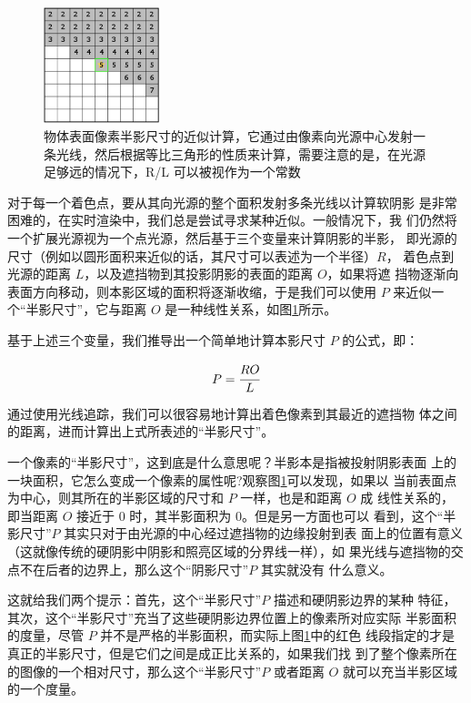 \begin{figure}
\sidecaption
	\includegraphics[width=0.3\textwidth]{figures/shadows/penumbra-size-calculation-1}
	\caption{物体表面像素半影尺寸的近似计算，它通过由像素向光源中心发射一条光线，然后根据等比三角形的性质来计算，需要注意的是，在光源足够远的情况下，R/L 可以被视作为一个常数}
	\label{f:df-penumbra-size-calculation}
\end{figure}

对于每一个着色点，要从其向光源的整个面积发射多条光线以计算软阴影 是非常困难的，在实时渲染中，我们总是尝试寻求某种近似。一般情况下，我 们仍然将一个扩展光源视为一个点光源，然后基于三个变量来计算阴影的半影， 即光源的尺寸（例如以圆形面积来近似的话，其尺寸可以表述为一个半径）$R$， 着色点到光源的距离 $L$，以及遮挡物到其投影阴影的表面的距离 $O$，如果将遮 挡物逐渐向表面方向移动，则本影区域的面积将逐渐收缩，于是我们可以使用 $P$ 来近似一个“半影尺寸”，它与距离 $O$ 是一种线性关系，如图\ref{f:df-penumbra-size-calculation}所示。

基于上述三个变量，我们推导出一个简单地计算本影尺寸 $P$ 的公式，即：

\begin{equation}
	P=\cfrac{RO}{L}
\end{equation}

通过使用光线追踪，我们可以很容易地计算出着色像素到其最近的遮挡物 体之间的距离，进而计算出上式所表述的“半影尺寸”。

一个像素的“半影尺寸”，这到底是什么意思呢？半影本是指被投射阴影表面 上的一块面积，它怎么变成一个像素的属性呢?观察图\ref{f:df-penumbra-size-calculation}可以发现，如果以 当前表面点为中心，则其所在的半影区域的尺寸和 $P$ 一样，也是和距离 $O$ 成 线性关系的，即当距离 $O$ 接近于 0 时，其半影面积为 0。但是另一方面也可以 看到，这个“半影尺寸”$P$ 其实只对于由光源的中心经过遮挡物的边缘投射到表 面上的位置有意义（这就像传统的硬阴影中阴影和照亮区域的分界线一样），如 果光线与遮挡物的交点不在后者的边界上，那么这个“阴影尺寸”$P$ 其实就没有 什么意义。

这就给我们两个提示：首先，这个“半影尺寸”$P$ 描述和硬阴影边界的某种 特征，其次，这个“半影尺寸”充当了这些硬阴影边界位置上的像素所对应实际 半影面积的度量，尽管 $P$ 并不是严格的半影面积，而实际上图\ref{f:df-penumbra-size-calculation}中的红色 线段指定的才是真正的半影尺寸，但是它们之间是成正比关系的，如果我们找 到了整个像素所在的图像的一个相对尺寸，那么这个“半影尺寸”$P$ 或者距离 $O$ 就可以充当半影区域的一个度量。

